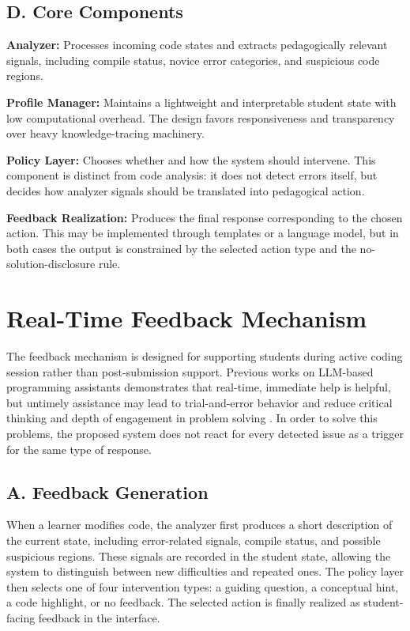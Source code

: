 \documentclass[conference]{IEEEtran}
\begin{document}
\subsection*{D. Core Components}


\textbf{Analyzer:} Processes incoming code states and extracts pedagogically relevant signals, including compile status, novice error categories, and suspicious code regions.

\textbf{Profile Manager:} Maintains a lightweight and interpretable student state with low computational overhead. The design favors responsiveness and transparency over heavy knowledge-tracing machinery.

\textbf{Policy Layer:} Chooses whether and how the system should intervene. This component is distinct from code analysis: it does not detect errors itself, but decides how analyzer signals should be translated into pedagogical action.

\textbf{Feedback Realization:} Produces the final response corresponding to the chosen action. This may be implemented through templates or a language model, but in both cases the output is constrained by the selected action type and the no-solution-disclosure rule.


\section{Real-Time Feedback Mechanism}

The feedback mechanism is designed for supporting students during active coding session rather than post-submission support. Previous works on LLM-based programming assistants demonstrates that real-time, immediate help is helpful, but untimely assistance may lead to trial-and-error behavior and reduce critical thinking and depth of engagement in problem solving \cite{PatternsofLLMPoweredProgrammingAssistant}. In order to solve this problems, the proposed system does not react for every detected issue as a trigger for the same type of response.

\subsection*{A. Feedback Generation}

When a learner modifies code, the analyzer first produces a short description of the current state, including error-related signals, compile status, and possible suspicious regions. These signals are recorded in the student state, allowing the system to distinguish between new difficulties and repeated ones. The policy layer then selects one of four intervention types: a guiding question, a conceptual hint, a code highlight, or no feedback. The selected action is finally realized as student-facing feedback in the interface.
\end{document}
